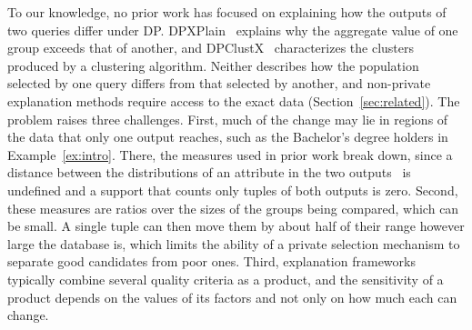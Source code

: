 To our knowledge, no prior work has focused on explaining how the outputs of two queries differ under DP.
DPXPlain~\cite{TaoGMR22} explains why the aggregate value of one group exceeds that of another, and DPClustX~\cite{DPClustX} characterizes the clusters produced by a clustering algorithm.
Neither describes how the population selected by one query differs from that selected by another, and non-private explanation methods require access to the exact data (Section~\ref{sec:related}).
The problem raises three challenges.
First, much of the change may lie in regions of the data that only one output reaches, such as the Bachelor's degree holders in Example~\ref{ex:intro}.
There, the measures used in prior work break down, since a distance between the distributions of an attribute in the two outputs~\cite{SeeDB,FEDEX} is undefined and a support that counts only tuples of both outputs is zero.
Second, these measures are ratios over the sizes of the groups being compared, which can be small.
A single tuple can then move them by about half of their range however large the database is, which limits the ability of a private selection mechanism to separate good candidates from poor ones.
Third, explanation frameworks typically combine several quality criteria as a product, and the sensitivity of a product depends on the values of its factors and not only on how much each can change.



